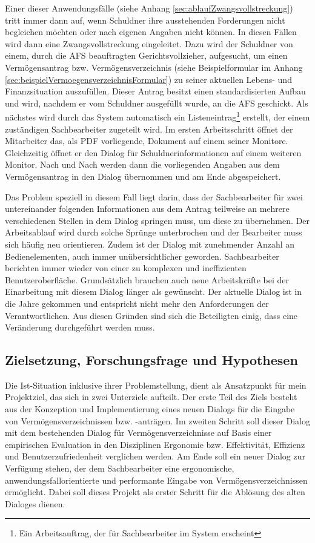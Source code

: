 Einer dieser Anwendungsfälle (siehe Anhang \ref{sec:ablaufZwangsvollstreckung}) tritt immer dann auf, wenn Schuldner ihre ausstehenden Forderungen nicht begleichen möchten oder nach eigenen Angaben nicht können. In diesen Fällen wird dann eine Zwangsvollstreckung eingeleitet. Dazu wird der Schuldner von einem, durch die \gls{AFS} beauftragten Gerichtsvollzieher, aufgesucht, um einen Vermögensantrag bzw. Vermögensverzeichnis (siehe Beispielformular im Anhang \ref{sec:beispielVermoegensverzeichnisFormular}) zu seiner aktuellen Lebens- und Finanzsituation auszufüllen. Dieser Antrag besitzt einen standardisierten Aufbau und wird, nachdem er vom Schuldner ausgefüllt wurde, an die \gls{AFS} geschickt. Als nächstes wird durch das System automatisch ein Listeneintrag\footnote{Ein Arbeitsauftrag, der für Sachbearbeiter im System erscheint} erstellt, der einem zuständigen Sachbearbeiter zugeteilt wird. Im ersten Arbeitsschritt öffnet der Mitarbeiter das, als PDF vorliegende, Dokument auf einem seiner Monitore. Gleichzeitig öffnet er den Dialog für Schuldnerinformationen auf einem weiteren Monitor. Nach und Nach werden dann die vorliegenden Angaben aus dem Vermögensantrag in den Dialog übernommen und am Ende abgespeichert.

Das Problem speziell in diesem Fall liegt darin, dass der Sachbearbeiter für zwei untereinander folgenden Informationen aus dem Antrag teilweise an mehrere verschiedenen Stellen in dem Dialog springen muss, um diese zu übernehmen. Der Arbeitsablauf wird durch solche Sprünge unterbrochen und der Bearbeiter muss sich häufig neu orientieren. Zudem ist der Dialog mit zunehmender Anzahl an Bedienelementen, auch immer unübersichtlicher geworden. Sachbearbeiter berichten immer wieder von einer zu komplexen und ineffizienten Benutzeroberfläche. Grundsätzlich brauchen auch neue Arbeitskräfte bei der Einarbeitung mit diesem Dialog länger als gewünscht. Der aktuelle Dialog ist in die Jahre gekommen und entspricht nicht mehr den Anforderungen der Verantwortlichen. Aus diesen Gründen sind sich die Beteiligten einig, dass eine Veränderung durchgeführt werden muss.


\subsection{Zielsetzung, Forschungsfrage und Hypothesen}
Die Ist-Situation inklusive ihrer Problemstellung, dient als Ansatzpunkt für mein Projektziel, das sich in zwei Unterziele aufteilt. Der erste Teil des Ziels besteht aus der Konzeption und Implementierung eines neuen Dialogs für die Eingabe von Vermögensverzeichnissen bzw. -anträgen. Im zweiten Schritt soll dieser Dialog mit dem bestehenden Dialog für Vermögensverzeichnisse auf Basis einer empirischen Evaluation in den Disziplinen Ergonomie bzw. Effektivität, Effizienz und Benutzerzufriedenheit verglichen werden. Am Ende soll ein neuer Dialog zur Verfügung stehen, der dem Sachbearbeiter eine ergonomische, anwendungsfallorientierte und performante Eingabe von Vermögensverzeichnissen ermöglicht. Dabei soll dieses Projekt als erster Schritt für die Ablösung des alten Dialoges dienen. 

